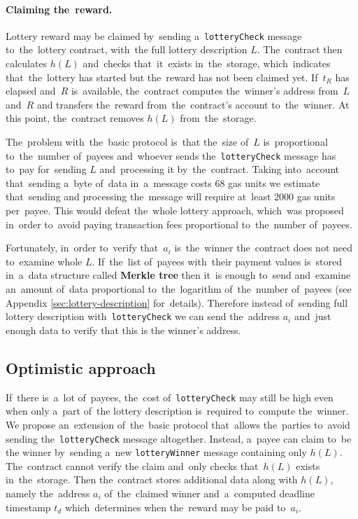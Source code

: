 \documentclass[a4paper]{article}
\newcommand{\lotteryhash}[1]{h({#1})}
\begin{document}
    \paragraph{Claiming the~reward.}
    Lottery reward may be claimed by~sending a~\texttt{lotteryCheck} message to~the~lottery contract, with~the
    full lottery description $L$. The~contract then calculates $\lotteryhash{L}$ and~checks that~it~exists in~the~storage,
    which~indicates that~the~lottery has started but the~reward has not been claimed yet.
    If~$t_R$ has elapsed and~$R$ is~available, the~contract computes the~winner's address from~$L$ and~$R$ and
    transfers the~reward from~the~contract's account to~the~winner. At this point, the~contract removes $\lotteryhash{L}$
    from~the~storage.

    The~problem with~the~basic protocol is~that the~size of~$L$ is~proportional to~the~number of~payees and~whoever
    sends the~\texttt{lotteryCheck} message has to~pay for~sending $L$ and~processing it by~the~contract.
    Taking into~account that~sending a~byte of~data in~a~message costs 68 gas units we estimate that~sending and
    processing the~message will require at~least 2000 gas units per~payee. This would defeat the~whole lottery
    approach, which~was proposed in~order to~avoid paying transaction fees proportional to~the~number of~payees.

    Fortunately, in~order to~verify that~$a_i$ is~the~winner the~contract does not need to~examine whole $L$.
    If~the~list of~payees with~their payment values is~stored in~a~data structure called \textbf{Merkle tree} then it~is
    enough to~send and~examine an~amount of~data proportional to~the~logarithm of~the~number of~payees
    (see Appendix \ref{sec:lottery-description} for~details). Therefore instead of~sending
    full lottery description with~\texttt{lotteryCheck} we can send the~address $a_i$ and~just enough
    data to verify that this is the winner's address.

\subsection{Optimistic approach}\label{sec:optimistic}
    If~there is~a~lot of~payees, the~cost of~\texttt{lotteryCheck} may still be high even when only a~part of~the
    lottery description is~required to~compute the~winner. We propose an~extension of~the~basic protocol that~allows
    the~parties to~avoid sending the~\texttt{lotteryCheck} message altogether. Instead, a~payee can claim to~be the
    winner by~sending a~new \texttt{lotteryWinner} message containing only $\lotteryhash{L}$. The~contract cannot verify the
    claim and~only checks that~$\lotteryhash{L}$ exists in~the~storage. Then the~contract stores additional data along with
    $\lotteryhash{L}$, namely the~address $a_i$ of~the~claimed winner and~a~computed deadline timestamp $t_d$ which~determines
    when the~reward may be paid to~$a_i$.
\end{document}
